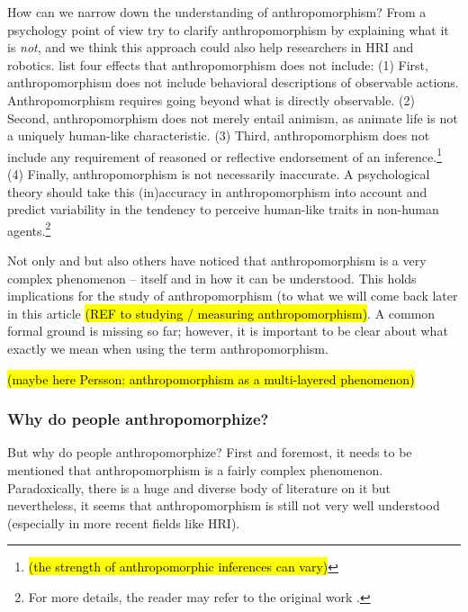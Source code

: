\documentclass{frontiersSCNS} %
\begin{document}
How can we narrow down the understanding of anthropomorphism? From a psychology point of view \cite{epley_when_2008} try to clarify anthropomorphism by explaining what it is \textit{not}, and we think this approach could also help researchers in HRI and robotics. \cite{epley_when_2008} list four effects that anthropomorphism does not include:
(1) First, anthropomorphism does not include behavioral descriptions of observable actions. Anthropomorphism requires going beyond what is directly observable.
(2) Second, anthropomorphism does not merely entail animism, as animate life is not a uniquely human-like characteristic.
(3) Third, anthropomorphism does not include any requirement of reasoned or reflective endorsement of an inference.\footnote{\hl{(the strength of anthropomorphic inferences can vary)}}
(4) Finally, anthropomorphism is not necessarily inaccurate. A psychological theory should take this (in)accuracy in anthropomorphism into account and predict variability in the tendency to perceive human-like traits in non-human agents.\footnote{For more details, the reader may refer to the original work \citep{epley_when_2008}.}

Not only \cite{epley_when_2008} and \cite{duffy_anthropomorphism_2002} but also others have noticed that anthropomorphism is a very complex phenomenon -- itself and in how it can be understood. This holds implications for the study of anthropomorphism (to what we will come back later in this article \hl{(REF to studying / measuring anthropomorphism)}.
A common formal ground is missing so far; however, it is important to be clear about what exactly we mean when using the term anthropomorphism.

\hl{(maybe here Persson: anthropomorphism as a multi-layered phenomenon)}



\subsubsection{Why do people anthropomorphize?\\}
\label{sec:explanations}

But why do people anthropomorphize? First and foremost, it needs to be mentioned that anthropomorphism is a fairly complex phenomenon. Paradoxically, there is a huge and diverse body of literature on it but nevertheless, it seems that anthropomorphism is still not very well understood (especially in more recent fields like HRI).
\end{document}

